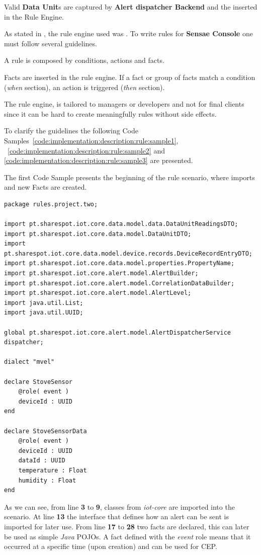 Valid \textbf{Data Unit}s are captured by \textbf{Alert dispatcher Backend} and the inserted in the Rule Engine.

As stated in , the rule engine used was . To write rules for \textbf{Sensae Console} one must follow several guidelines.

A  rule is composed by conditions, actions and facts.

Facts are inserted in the rule engine. If a fact or group of facts match a condition (\textit{when} section), an action is triggered (\textit{then} section).

The rule engine, is tailored to managers or developers and not for final clients since it can be hard to create meaningfully rules without side effects.

To clarify the guidelines the following Code Samples~\ref{code:implementation:description:rule:sample1}, ~\ref{code:implementation:description:rule:sample2} and \ref{code:implementation:description:rule:sample3} are presented.

The first Code Sample presents the beginning of the rule scenario, where imports and new Facts are created.

\begin{lstlisting}[caption=Rule Scenario Example - Part 1, label={code:implementation:description:rule:sample1}]
package rules.project.two;

import pt.sharespot.iot.core.data.model.data.DataUnitReadingsDTO;
import pt.sharespot.iot.core.data.model.DataUnitDTO;
import pt.sharespot.iot.core.data.model.device.records.DeviceRecordEntryDTO;
import pt.sharespot.iot.core.data.model.properties.PropertyName;
import pt.sharespot.iot.core.alert.model.AlertBuilder;
import pt.sharespot.iot.core.alert.model.CorrelationDataBuilder;
import pt.sharespot.iot.core.alert.model.AlertLevel;
import java.util.List;
import java.util.UUID;

global pt.sharespot.iot.core.alert.model.AlertDispatcherService dispatcher;

dialect "mvel"

declare StoveSensor
    @role( event )
    deviceId : UUID
end

declare StoveSensorData
    @role( event )
    deviceId : UUID
    dataId : UUID
    temperature : Float
    humidity : Float
end
\end{lstlisting}

As we can see, from line \textbf{3} to \textbf{9}, classes from \textit{iot-core} are imported into the scenario.
At line \textbf{13} the interface that defines how an alert can be sent is imported for later use.
From line \textbf{17} to \textbf{28} two facts are declared, this can later be used as simple \textit{Java} POJOs. A fact defined with the \textit{event} role means that it occurred at a specific time (upon creation) and can be used for \gls{CEP}. 

